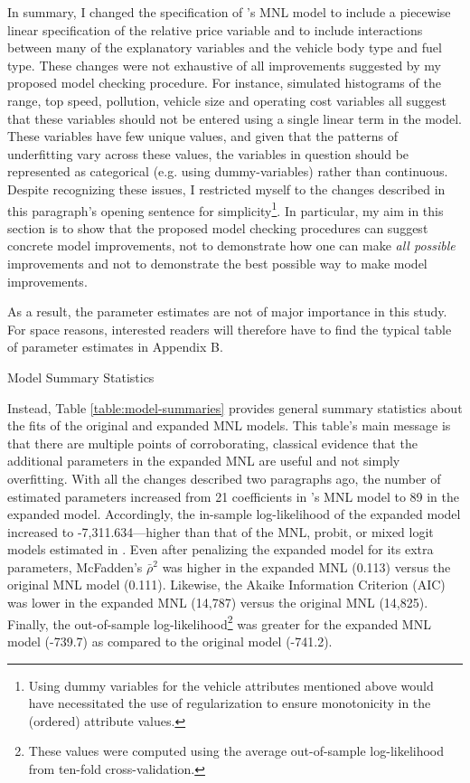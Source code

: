 \documentclass[preprint]{elsarticle}
\begin{document}
In summary, I changed the specification of \citeauthor{brownstone_forecasting_1998}'s MNL model to include a piecewise linear specification of the relative price variable and to include interactions between many of the explanatory variables and the vehicle body type and fuel type. These changes were not exhaustive of all improvements suggested by my proposed model checking procedure. For instance, simulated histograms of the range, top speed, pollution, vehicle size and operating cost variables all suggest that these variables should not be entered using a single linear term in the model. These variables have few unique values, and given that the patterns of underfitting vary across these values, the variables in question should be represented as categorical (e.g. using dummy-variables) rather than continuous. Despite recognizing these issues, I restricted myself to the changes described in this paragraph's opening sentence for simplicity\footnote{Using dummy variables for the vehicle attributes mentioned above would have necessitated the use of regularization to ensure monotonicity in the (ordered) attribute values.}. In particular, my aim in this section is to show that the proposed model checking procedures can suggest concrete model improvements, not to demonstrate how one can make \textit{all possible} improvements and not to demonstrate the best possible way to make model improvements.

As a result, the parameter estimates are not of major importance in this study. For space reasons, interested readers will therefore have to find the typical table of parameter estimates in Appendix B.

\begin{table}
\centering

\caption{Model Summary Statistics}
\label{table:model-summaries}
\end{table}

Instead, Table \ref{table:model-summaries} provides general summary statistics about the fits of the original and expanded MNL models. This table's main message is that there are multiple points of corroborating, classical evidence that the additional parameters in the expanded MNL are useful and not simply overfitting. With all the changes described two paragraphs ago, the number of estimated parameters increased from 21 coefficients in \citeauthor{brownstone_forecasting_1998}'s MNL model to 89 in the expanded model. Accordingly, the in-sample log-likelihood of the expanded model increased to -7,311.634---higher than that of the MNL, probit, or mixed logit models estimated in \citet{brownstone_forecasting_1998}. Even after penalizing the expanded model for its extra parameters, McFadden's $\bar{\rho}^2$ was higher in the expanded MNL (0.113) versus the original MNL model (0.111). Likewise, the Akaike Information Criterion (AIC) was lower in the expanded MNL (14,787) versus the original MNL (14,825). Finally, the out-of-sample log-likelihood\footnote{These values were computed using the average out-of-sample log-likelihood from ten-fold cross-validation. } was greater for the expanded MNL model (-739.7) as compared to the original model (-741.2).
\end{document}
